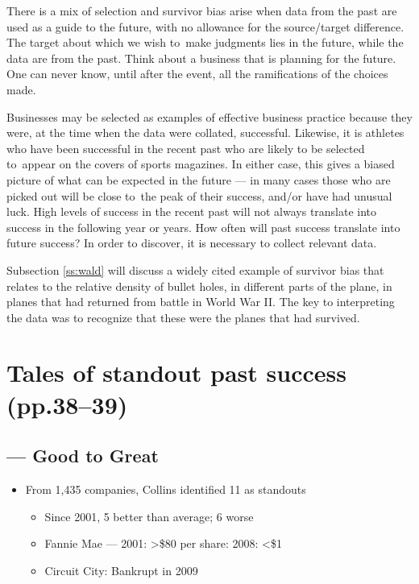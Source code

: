\documentclass[
  10pt,
  b5paper]{book}
\providecommand{\tightlist}{%
  \setlength{\itemsep}{0pt}\setlength{\parskip}{0pt}}
\begin{document}
There is a mix of selection and survivor bias arise when data
from the past are used as a guide to the future, with no
allowance for the source/target difference. The target about
which we wish to~make judgments lies in the future, while the
data are from the past. Think about a business that is
planning for the future. One can never know, until after the
event, all the ramifications of the choices made.

Businesses may be selected as examples of effective business
practice because they were, at the time when the data were
collated, successful. Likewise, it is athletes who have
been successful in the recent past who are likely to be
selected to~appear on the covers of sports magazines.
In either case, this gives a biased picture of what can be
expected in the future --- in many cases those who are
picked out will be close to~the peak of their success,
and/or have had unusual luck. High levels of success in
the recent past will not always translate into success
in the following year or years. How often will past
success translate into future success? In order to
discover, it is necessary to collect relevant data.

Subsection \ref{ss:wald} will discuss a widely cited example
of survivor bias that relates to the relative density
of bullet holes, in different parts of the plane, in planes
that had returned from battle in World War II. The key to
interpreting the data was to recognize that these were the
planes that had survived.

\hypertarget{tales-of-standout-past-success-pp.3839}{%
\section{Tales of standout past success (pp.38--39)}\label{tales-of-standout-past-success-pp.3839}}

\hypertarget{collins_2001-good-to-great}{%
\subsection*{\texorpdfstring{\citet{collins_2001} --- Good to Great}{@collins\_2001 --- Good to Great}}\label{collins_2001-good-to-great}}

\begin{itemize}
\tightlist
\item
  From 1,435 companies, Collins identified 11 as standouts

  \begin{itemize}
  \tightlist
  \item
    Since 2001, 5 better than average; 6 worse
  \item
    Fannie Mae --- 2001: \textgreater\$80 per share: 2008: \textless\$1
  \item
    Circuit City: Bankrupt in 2009
  \end{itemize}
\end{itemize}
\end{document}
